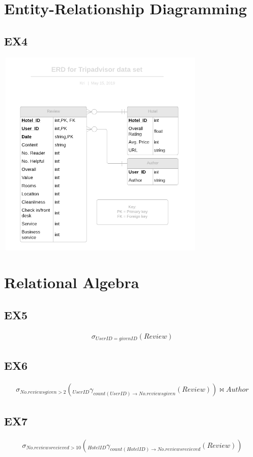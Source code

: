 \documentclass{article}
\begin{document}
	\section{Entity-Relationship Diagramming}
	
	\subsection{EX4}
	\includegraphics[width=10cm, height=10cm]{EX4_ERD_Tripadvisor.png}
	
	
	\section{Relational Algebra}
	
	\subsection{EX5}
	\begin{eqnarray}
	\sigma_{User ID = given ID}(Review)
	\end{eqnarray}
		
	\subsection{EX6}
	\begin{eqnarray}
	\sigma _{No. reviews given > 2}(_{User ID} \gamma _{count(User ID) \rightarrow No. reviews given}(Review)) \bowtie Author
	\end{eqnarray}
	
	\subsection{EX7}
	\begin{eqnarray}
		\sigma _{No. reviews recieved > 10}(_{Hotel ID} \gamma _{count(Hotel ID) \rightarrow No. reviews recieved}(Review))
	\end{eqnarray}
	
\end{document}
